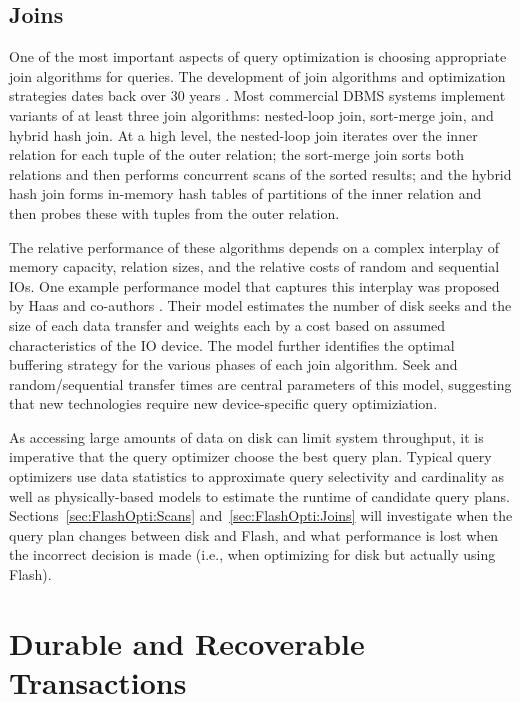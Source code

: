 \subsection{Joins}
\label{sec:Background:Joins}

One of the most important aspects of query optimization is choosing appropriate join algorithms for queries.
The development of join algorithms and optimization strategies dates back over 30 years \cite{Selinger1979,Shapiro1986}. 
Most commercial DBMS systems implement variants of at least three join algorithms: nested-loop join, sort-merge join, and hybrid hash join.
At a high level, the nested-loop join iterates over the inner relation for each tuple of the outer relation; the sort-merge join sorts both relations and then performs concurrent scans of the sorted results; and the hybrid hash join forms in-memory hash tables of partitions of the inner relation and then probes these with tuples from the outer relation.

The relative performance of these algorithms depends on a complex interplay of memory capacity, relation sizes, and the relative costs of random and sequential IOs.  
One example performance model that captures this interplay was proposed by Haas and co-authors \cite{DBLP:journals/vldb/HaasCLS97}.
Their model estimates the number of disk seeks and the size of each data transfer and weights each by a cost based on assumed characteristics of the IO device.
The model further identifies the optimal buffering strategy for the various phases of each join algorithm.
Seek and random/sequential transfer times are central parameters of this model, suggesting that new technologies require new device-specific query optimiziation.

As accessing large amounts of data on disk can limit system throughput, it is imperative that the query optimizer choose the best query plan.
Typical query optimizers use data statistics to approximate query selectivity and cardinality as well as physically-based models to estimate the runtime of candidate query plans.
Sections~\ref{sec:FlashOpti:Scans} and~\ref{sec:FlashOpti:Joins} will investigate when the query plan changes between disk and Flash, and what performance is lost when the incorrect decision is made (i.e., when optimizing for disk but actually using Flash).

\section{Durable and Recoverable Transactions}
\label{sec:Background:Recovery}

